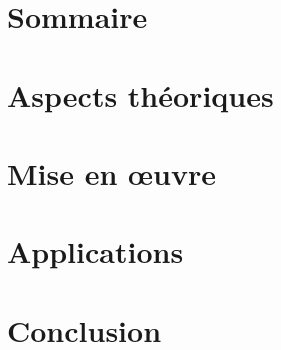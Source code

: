 \documentclass{beamer}
\begin{document}
\begin{frame}[plain]
	\titlepage
\end{frame}

\section{Sommaire}


\section{Aspects théoriques}


\section{Mise en \oe uvre}


\section{Applications}


\section{Conclusion}

\end{document}
